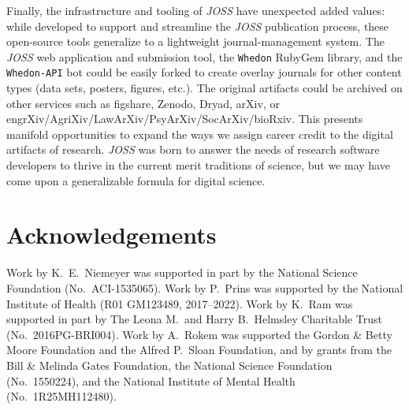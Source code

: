 \documentclass{article}
\newcommand{\add}[1]{{\sloppy\cbcolor{teal}\textcolor{teal}{\cbstart {#1}\cbend}}}  %
\newcommand\joss{\textit{JOSS}}
\begin{document}
Finally, the infrastructure and tooling of \joss{} have unexpected added values: while developed to
support and streamline the \joss{} publication process, these open-source tools generalize to a lightweight journal-management system.
The \joss{} web application and submission tool, the \texttt{Whedon} RubyGem library, and the \texttt{Whedon-API} bot could be easily forked to create \add{open-access} overlay journals for other content types (data sets, posters, figures, etc.).
The original artifacts could be archived on other
services such as figshare, Zenodo, Dryad, arXiv, or engrXiv\slash AgriXiv\slash LawArXiv\slash PsyArXiv\slash SocArXiv\slash bioRxiv.
This presents manifold opportunities to expand the ways we assign career credit to the digital artifacts of research.
\joss{} was born to answer the needs of research software developers to thrive in the current merit traditions of science, but we may have come upon a generalizable formula for digital science.

\section*{Acknowledgements}

Work by K.~E.~Niemeyer was supported in part by the National Science Foundation (No.\ ACI-1535065).
Work by P.~Prins was supported by the National Institute of Health (R01 GM123489, 2017--2022).
Work by K.~Ram was supported in part by The Leona M.\ and Harry B.~Helmsley Charitable Trust (No.\ 2016PG-BRI004).
Work by A.~Rokem was supported \add{by} the Gordon \& Betty Moore Foundation and
the Alfred P.~Sloan Foundation, and by grants from the Bill \& Melinda Gates
Foundation, the National Science Foundation (No.\ 1550224), and the National
Institute of Mental Health (No.\ 1R25MH112480).

\printbibliography
\end{document}
